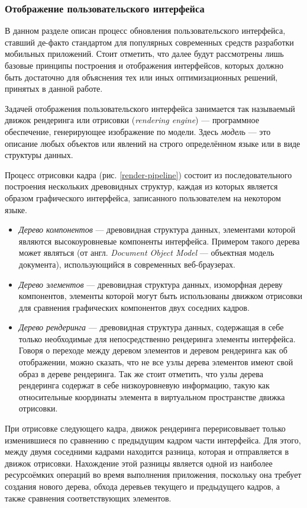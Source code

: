 \subsubsection{Отображение пользовательского интерфейса}
\label{section:render-pipeline}
В данном разделе описан процесс обновления пользовательского интерфейса,
ставший де-факто стандартом для популярных современных средств разработки
мобильных приложений. Стоит отметить, что далее будут рассмотрены лишь базовые принципы построения и отображения интерфейсов, которых должно быть
достаточно для объяснения тех или иных оптимизационных решений, принятых в
данной работе.

Задачей отображения пользовательского интерфейса занимается
так называемый движок рендеринга или отрисовки (\textit{ren\-dering engine})
--- программное обеспечение, генерирующее изображение по модели.
Здесь \textit{модель} --- это описание любых объектов или явлений на строго
определённом языке или в виде структуры данных.

Процесс отрисовки кадра (рис. \ref{render-pipeline}) состоит из
последовательного построения нескольких древовидных структур, каждая из
которых является образом графического интерфейса, записанного пользователем
на некотором языке.
\begin{itemize}
	\item \textit{Дерево компонентов} --- древовидная структура данных,
	элементами которой являются	высокоуровневые компоненты интерфейса.
	Примером такого дерева может являться  (от англ.
	\textit{Document Object Model} --- объектная модель документа),
	использующийся в современных веб-браузерах.
	\item \textit{Дерево элементов} --- древовидная структура данных,
	изоморфная дереву компонентов, элементы которой могут быть
	использованы движком отрисовки для сравнения графических
	компонентов двух соседних кадров.
	\item \textit{Дерево рендеринга} --- древовидная структура данных,
	содержащая в себе только необходимые для непосредственно рендеринга
	элементы интерфейса. Говоря	о переходе между деревом элементов и деревом
	рендеринга как об отображении, можно сказать, что не все узлы дерева
	элементов имеют	свой образ в дереве рендеринга. Так же стоит отметить,
	что узлы дерева	рендеринга содержат в себе низкоуровневую информацию,
	такую как относительные координаты элемента в виртуальном пространстве
	движка отрисовки.
\end{itemize}

При отрисовке следующего кадра, движок рендеринга перерисовывает только
изменившиеся по сравнению с предыдущим кадром части интерфейса. Для этого,
между двумя соседними кадрами находится разница, которая и отправляется в
движок отрисовки. Нахождение этой разницы является одной из наиболее
ресурсоёмких операций во время выполнения приложения, поскольку она требует
создания нового дерева, обхода деревьев текущего и предыдущего кадров, а
также сравнения соответствующих элементов.

